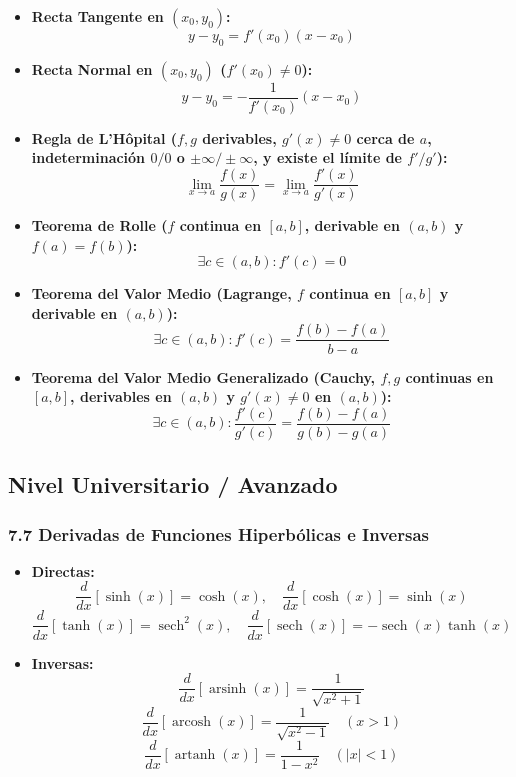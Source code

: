 \documentclass[11pt,a4paper]{article}
\begin{document}
\begin{itemize}
  \item \textbf{Recta Tangente en $(x_0, y_0)$:}
  \[
    y - y_0 = f'(x_0)(x - x_0)
  \]
  \item \textbf{Recta Normal en $(x_0, y_0)$ ($f'(x_0) \ne 0$):}
  \[
    y - y_0 = -\frac{1}{f'(x_0)}(x - x_0)
  \]
  \item \textbf{Regla de L'Hôpital ($f, g$ derivables, $g'(x) \ne 0$ cerca de $a$, indeterminación $0/0$ o $\pm\infty/\pm\infty$, y existe el límite de $f'/g'$):}
  \[
    \lim_{x \to a} \frac{f(x)}{g(x)} = \lim_{x \to a} \frac{f'(x)}{g'(x)}
  \]
  \item \textbf{Teorema de Rolle ($f$ continua en $[a, b]$, derivable en $(a, b)$ y $f(a) = f(b)$):}
  \[
    \exists c \in (a, b) : f'(c) = 0
  \]
  \item \textbf{Teorema del Valor Medio (Lagrange, $f$ continua en $[a, b]$ y derivable en $(a, b)$):}
  \[
    \exists c \in (a, b) : f'(c) = \frac{f(b) - f(a)}{b - a}
  \]
  \item \textbf{Teorema del Valor Medio Generalizado (Cauchy, $f, g$ continuas en $[a, b]$, derivables en $(a, b)$ y $g'(x) \ne 0$ en $(a, b)$):}
  \[
    \exists c \in (a, b) : \frac{f'(c)}{g'(c)} = \frac{f(b) - f(a)}{g(b) - g(a)}
  \]
\end{itemize}

\subsection*{Nivel Universitario / Avanzado}

\subsubsection*{7.7 Derivadas de Funciones Hiperbólicas e Inversas}

\begin{itemize}
  \item \textbf{Directas:}
  \[
    \frac{d}{dx}[\sinh(x)] = \cosh(x), \quad \frac{d}{dx}[\cosh(x)] = \sinh(x)
  \]
  \[
    \frac{d}{dx}[\tanh(x)] = \operatorname{sech}^2(x), \quad \frac{d}{dx}[\operatorname{sech}(x)] = -\operatorname{sech}(x)\tanh(x)
  \]
  \item \textbf{Inversas:}
  \[
    \frac{d}{dx}[\operatorname{arsinh}(x)] = \frac{1}{\sqrt{x^2 + 1}}
  \]
  \[
    \frac{d}{dx}[\operatorname{arcosh}(x)] = \frac{1}{\sqrt{x^2 - 1}} \quad (x > 1)
  \]
  \[
    \frac{d}{dx}[\operatorname{artanh}(x)] = \frac{1}{1 - x^2} \quad (|x| < 1)
  \]
\end{itemize}
\end{document}
